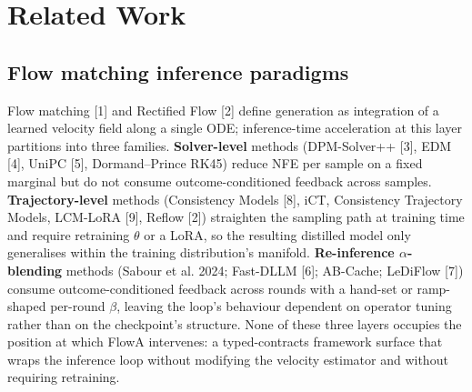 \documentclass[journal,twocolumn,final]{IEEEtran}
\begin{document}
\section{Related Work}

\subsection{Flow matching inference paradigms}

Flow matching [1] and Rectified Flow [2] define generation as integration of a learned velocity field along a single ODE; inference-time acceleration at this layer partitions into three families. \textbf{Solver-level} methods (DPM-Solver++ [3], EDM [4], UniPC [5], Dormand--Prince RK45) reduce NFE per sample on a fixed marginal but do not consume outcome-conditioned feedback across samples. \textbf{Trajectory-level} methods (Consistency Models [8], iCT, Consistency Trajectory Models, LCM-LoRA [9], Reflow [2]) straighten the sampling path at training time and require retraining $\theta$ or a LoRA, so the resulting distilled model only generalises within the training distribution's manifold. \textbf{Re-inference $\alpha$-blending} methods (Sabour et al. 2024; Fast-DLLM [6]; AB-Cache; LeDiFlow [7]) consume outcome-conditioned feedback across rounds with a hand-set or ramp-shaped per-round $\beta$, leaving the loop's behaviour dependent on operator tuning rather than on the checkpoint's structure. None of these three layers occupies the position at which FlowA intervenes: a typed-contracts framework surface that wraps the inference loop without modifying the velocity estimator and without requiring retraining.
\end{document}
